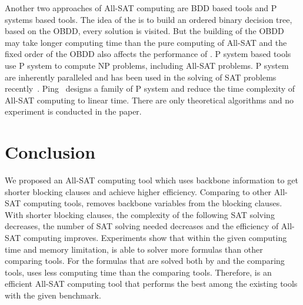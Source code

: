 Another two approaches of All-SAT computing are BDD based tools and P systems based tools. The idea of the \bdd is to build an ordered binary decision tree, based on the OBDD, every solution is visited. But the building of the OBDD may take longer computing time than the pure computing of All-SAT and the fixed order of the OBDD also affects the performance of \bdd.
P system based tools use P system to compute NP problems, including All-SAT problems. P system are inherently paralleled and has been used in the solving of SAT problems recently~\cite{p}. Ping~\cite{pa} designs a family of P system and reduce the time complexity of All-SAT computing to linear time. There are only theoretical algorithms and no experiment is conducted in the paper.

\section{Conclusion} \label{sec:conc}
We proposed an All-SAT computing tool \tool which uses backbone information to get shorter blocking clauses and achieve higher efficiency.
Comparing to other All-SAT computing tools, \tool removes backbone variables from the blocking clauses. With shorter blocking clauses, the complexity of the following SAT solving decreases, the number of SAT solving needed decreases and the efficiency of All-SAT computing improves. 
Experiments show that within the given computing time and memory limitation, \tool is able to solver more formulas than other comparing tools.
For the formulas that are solved both by \tool and the comparing tools, \tool uses less computing time than the comparing tools.
Therefore, \tool is an efficient All-SAT computing tool that performs the best among the existing tools with the given benchmark.